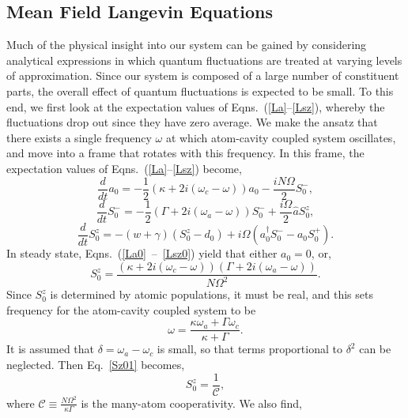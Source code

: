\documentclass[aps,
twocolumn,
superscriptaddress,groupedaddress]{revtex4}
\begin{document}
\subsection{Mean Field Langevin Equations}

Much of the physical insight into our system can be gained by
considering analytical expressions in which quantum fluctuations are
treated at varying levels of approximation. Since our system is
composed of a large number of constituent parts, the overall effect of
quantum fluctuations is expected to be small. To this end, we first
look at the expectation values of Eqns.~(\ref{La}--\ref{Lsz}), whereby
the fluctuations drop out since they have zero average. We make the ansatz that there exists a single frequency $\omega$ at which atom-cavity coupled system oscillates, and move into a frame that rotates with this frequency. In this frame, the expectation values of Eqns.~(\ref{La}--\ref{Lsz}) become,
\begin{equation}
\frac{d}{dt} a_0= -\frac{1}{2} (\kappa +2i(\omega_c-\omega)) a_0
-\frac{i N \Omega}{2} S_0^{-},
\label{La0}
\end{equation}
\begin{equation}
\frac{d}{dt} S_0^{-} =
-\frac{1}{2} \left(\Gamma +2 i (\omega_a-\omega) \right)  S_0^{-}
+\frac{i \Omega}{2} \hat{a} S_0^{z},
\end{equation}
\begin{equation}
\frac{d}{dt} S_0^{z} = -(w+\gamma)\left( S_0^{z} - d_0\right)
+i\Omega \left( a_0^{\dagger} S_0^{-} - a_0 S_0^{+} \right).
\label{Lsz0}
\end{equation}
In steady state, Eqns.~(\ref{La0}~--~\ref{Lsz0}) yield that either
$a_0=0$, or,
\begin{equation}
S_0^{z}=
\frac{(\kappa+2i(\omega_c-\omega))(\Gamma+2i(\omega_a-\omega))}{N\Omega^2}.
\label{Sz01}
\end{equation}
Since $S_0^{z}$ is determined by atomic populations, it must be real,
and this sets frequency for the atom-cavity coupled system to be
\begin{equation}
\omega = \frac{\kappa \omega_a + \Gamma \omega_c}{\kappa+\Gamma}.
\label{atomcavityfrequencycenter1}
\end{equation}
It is assumed that $\delta = \omega_a-\omega_c$ is small, so that terms
proportional to $\delta^2$ can be neglected. Then Eq.~\ref{Sz01} becomes,
\begin{equation}
S_0^{z}=\frac{1}{\mathcal{C}},
\end{equation}
where $\mathcal{C}\equiv \frac{N \Omega^2}{\kappa \Gamma}$ is the many-atom cooperativity. We also find,
\end{document}
